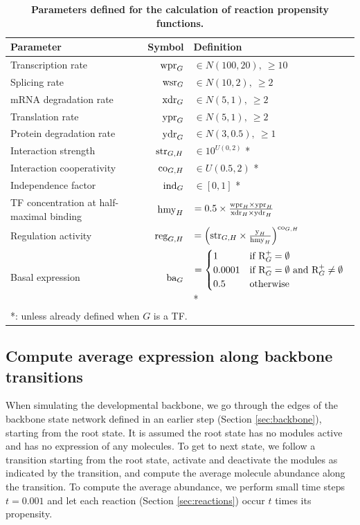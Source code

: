 \begin{table}[h]
	\caption{\textbf{Parameters defined for the calculation of reaction propensity functions.}} \label{tab:reaction_params}
	\centering
	\begin{tabular}{|lrl|}
		\hline
		Parameter & Symbol & Definition \\ \hline \hline
		Transcription rate & $\text{wpr}_{G}$ & $\in N(100, 20),\ \geq 10$ \\
		Splicing rate & $\text{wsr}_{G}$ & $\in N(10, 2),\ \geq 2$ \\
		mRNA degradation rate & $\text{xdr}_{G}$ & $\in N(5, 1),\ \geq 2$ \\
		Translation rate & $\text{ypr}_{G}$ & $\in N(5, 1),\ \geq 2$ \\
		Protein degradation rate & $\text{ydr}_{G}$ & $\in N(3, 0.5),\ \geq 1$ \\
		Interaction strength & $\text{str}_{G,H}$ & $\in 10^{U(0, 2)}$ * \\ 
		Interaction cooperativity & $\text{co}_{G,H}$ & $\in U(0.5, 2)$ * \\
    Independence factor & $\text{ind}_{G}$ & $\in [0, 1]$ * \\ \hline\hline
		TF concentration at half-maximal binding & $\text{hmy}_{H}$ & $= 0.5 \times \frac{\text{wpr}_{H} \times \text{ypr}_{H}}{\text{xdr}_{H} \times \text{ydr}_{H}}$ \\ 
		Regulation activity & $\text{reg}_{G,H}$ & $= \left(\text{str}_{G,H} \times \frac{\text{y}_{H}}{\text{hmy}_{H}}\right) ^ {\text{co}_{G,H}}$ \\
		Basal expression & $\text{ba}_{G}$ & $= \begin{cases} 1 & \mbox{if } \text{R}^+_{G} = \emptyset \\ 0.0001 & \mbox{if } \text{R}^-_{G} = \emptyset \mbox{ and } \text{R}^+_{G} \neq \emptyset \\ 0.5 & \mbox{otherwise} \end{cases}$ * \\ \hline
		\multicolumn{3}{l}{*: unless already defined when $G$ is a TF.}
	\end{tabular}
\end{table}


\subsection{Compute average expression along backbone transitions} \label{sec:dyngen_sim_backbone}

When simulating the developmental backbone, we go through the edges of the backbone state network defined in an earlier step (Section \ref{sec:backbone}), starting from the root state. It is assumed the root state has no modules active and has no expression of any molecules. To get to next state, we follow a transition starting from the root state, activate and deactivate the modules as indicated by the transition, and compute the average molecule abundance along the transition. To compute the average abundance, we perform small time steps $t = 0.001$ and let each reaction (Section \ref{sec:reactions}) occur $t$ times its propensity. 

